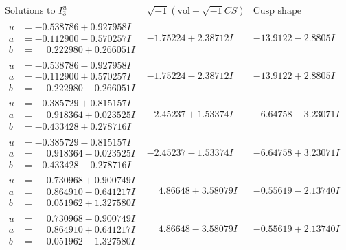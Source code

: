 \documentclass[1p]{elsarticle_modified}
\theoremstyle{definition}
\newcommand{\I}{\sqrt{-1}}
\begin{document}
$$\begin{array}{c|c|c}  
\text{Solutions to }I^u_{3}& \I (\text{vol} + \sqrt{-1}CS) & \text{Cusp shape}\\
 \hline 
\begin{aligned}
u &= -0.538786 + 0.927958 I \\
a &= -0.112900 - 0.570257 I \\
b &= \phantom{-}0.222980 + 0.266051 I\end{aligned}
 & -1.75224 + 2.38712 I & -13.9122 - 2.8805 I \\ \hline\begin{aligned}
u &= -0.538786 - 0.927958 I \\
a &= -0.112900 + 0.570257 I \\
b &= \phantom{-}0.222980 - 0.266051 I\end{aligned}
 & -1.75224 - 2.38712 I & -13.9122 + 2.8805 I \\ \hline\begin{aligned}
u &= -0.385729 + 0.815157 I \\
a &= \phantom{-}0.918364 + 0.023525 I \\
b &= -0.433428 + 0.278716 I\end{aligned}
 & -2.45237 + 1.53374 I & -6.64758 - 3.23071 I \\ \hline\begin{aligned}
u &= -0.385729 - 0.815157 I \\
a &= \phantom{-}0.918364 - 0.023525 I \\
b &= -0.433428 - 0.278716 I\end{aligned}
 & -2.45237 - 1.53374 I & -6.64758 + 3.23071 I \\ \hline\begin{aligned}
u &= \phantom{-}0.730968 + 0.900749 I \\
a &= \phantom{-}0.864910 - 0.641217 I \\
b &= \phantom{-}0.051962 + 1.327580 I\end{aligned}
 & \phantom{-}4.86648 + 3.58079 I & -0.55619 - 2.13740 I \\ \hline\begin{aligned}
u &= \phantom{-}0.730968 - 0.900749 I \\
a &= \phantom{-}0.864910 + 0.641217 I \\
b &= \phantom{-}0.051962 - 1.327580 I\end{aligned}
 & \phantom{-}4.86648 - 3.58079 I & -0.55619 + 2.13740 I \\ \hline\begin{aligned}

\end{aligned}
\end{array}$$
\end{document}
